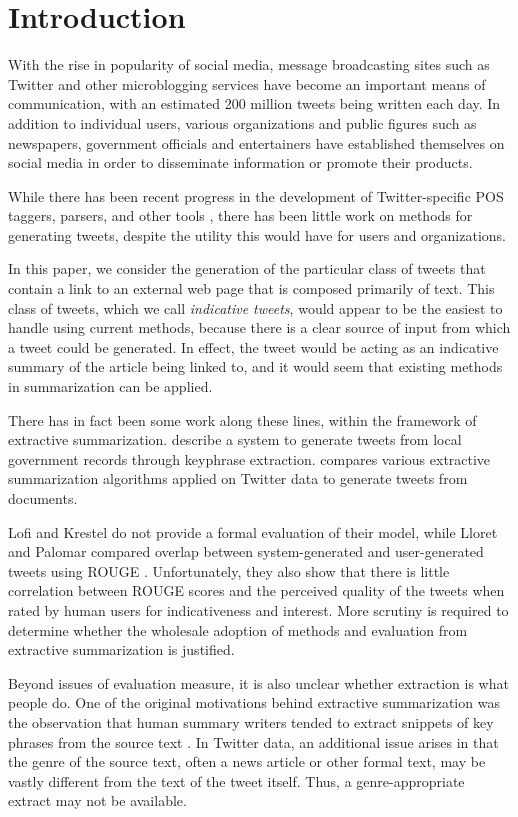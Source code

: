 \section{Introduction}
With the rise in popularity of social media, message broadcasting sites such as Twitter and other microblogging services have become an important means of communication, with an estimated 200 million tweets being written each day. In addition to individual users, various organizations and public figures such as newspapers, government officials and entertainers have established themselves on social media in order to disseminate information or promote their products. 

While there has been recent progress in the development of Twitter-specific POS taggers, parsers, and other tools \cite{owoputi-etal-2013,kong-etal-2014}, there has been little work on methods for generating tweets, despite the utility this would have for users and organizations. 

In this paper, we consider the generation of the particular class of tweets that contain a link to an external web page that is composed primarily of text. This class of tweets, which we call \emph{indicative tweets}, would appear to be the easiest to handle using current methods, because there is a clear source of input from which a tweet could be generated. In effect, the tweet would be acting as an indicative summary of the article being linked to, and it would seem that existing methods in summarization can be applied. 

There has in fact been some work along these lines, within the framework of extractive summarization.  describe a system to generate tweets from local government records through keyphrase extraction.  compares various extractive summarization algorithms applied on Twitter data to generate tweets from documents. 

Lofi and Krestel do not provide a formal evaluation of their model, while Lloret and Palomar compared overlap between system-generated and user-generated tweets using ROUGE 
\cite{lin-2004}. Unfortunately, they also show that there is little correlation between ROUGE scores and the perceived quality of the tweets when rated by human users for indicativeness and interest. More scrutiny is required to determine whether the wholesale adoption of methods and evaluation from extractive summarization is justified.

Beyond issues of evaluation measure, it is also unclear whether extraction is what people do. One of the original motivations behind extractive summarization was the observation that human summary writers tended to extract snippets of key phrases from the source text \cite{mani-2001}. In Twitter data, an additional issue arises in that the genre of the source text, often a news article or other formal text, may be vastly different from the text of the tweet itself. Thus, a genre-appropriate extract may not be available.


